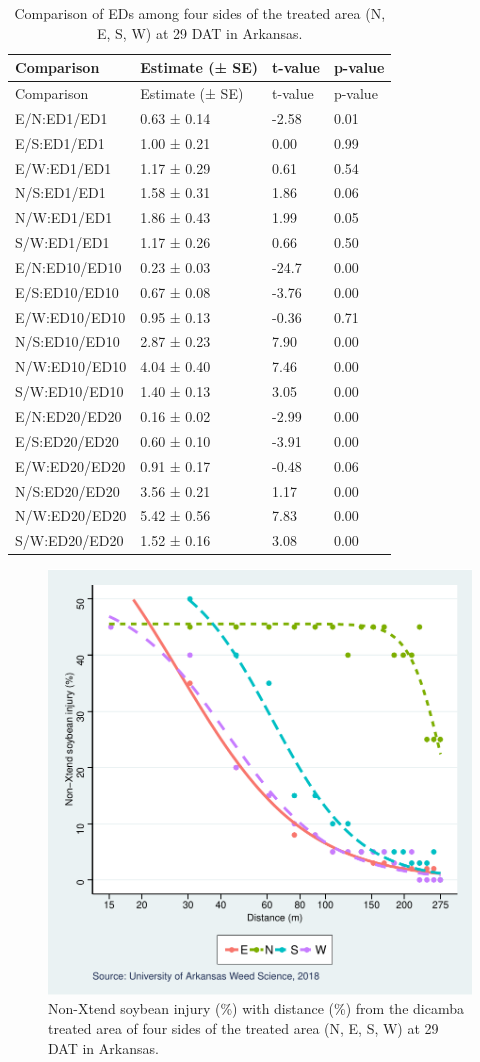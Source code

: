 \documentclass[]{article}
\begin{document}
\begin{longtable}[]{@{}llll@{}}
\caption{Comparison of EDs among four sides of the treated area (N, E,
S, W) at 29 DAT in Arkansas.}\tabularnewline
\toprule
Comparison & Estimate (± SE) & t-value & p-value\tabularnewline
\midrule
\endfirsthead
\toprule
Comparison & Estimate (± SE) & t-value & p-value\tabularnewline
\midrule
\endhead
E/N:ED1/ED1 & 0.63 ± 0.14 & -2.58 & 0.01\tabularnewline
E/S:ED1/ED1 & 1.00 ± 0.21 & 0.00 & 0.99\tabularnewline
E/W:ED1/ED1 & 1.17 ± 0.29 & 0.61 & 0.54\tabularnewline
N/S:ED1/ED1 & 1.58 ± 0.31 & 1.86 & 0.06\tabularnewline
N/W:ED1/ED1 & 1.86 ± 0.43 & 1.99 & 0.05\tabularnewline
S/W:ED1/ED1 & 1.17 ± 0.26 & 0.66 & 0.50\tabularnewline
E/N:ED10/ED10 & 0.23 ± 0.03 & -24.7 & 0.00\tabularnewline
E/S:ED10/ED10 & 0.67 ± 0.08 & -3.76 & 0.00\tabularnewline
E/W:ED10/ED10 & 0.95 ± 0.13 & -0.36 & 0.71\tabularnewline
N/S:ED10/ED10 & 2.87 ± 0.23 & 7.90 & 0.00\tabularnewline
N/W:ED10/ED10 & 4.04 ± 0.40 & 7.46 & 0.00\tabularnewline
S/W:ED10/ED10 & 1.40 ± 0.13 & 3.05 & 0.00\tabularnewline
E/N:ED20/ED20 & 0.16 ± 0.02 & -2.99 & 0.00\tabularnewline
E/S:ED20/ED20 & 0.60 ± 0.10 & -3.91 & 0.00\tabularnewline
E/W:ED20/ED20 & 0.91 ± 0.17 & -0.48 & 0.06\tabularnewline
N/S:ED20/ED20 & 3.56 ± 0.21 & 1.17 & 0.00\tabularnewline
N/W:ED20/ED20 & 5.42 ± 0.56 & 7.83 & 0.00\tabularnewline
S/W:ED20/ED20 & 1.52 ± 0.16 & 3.08 & 0.00\tabularnewline
\bottomrule
\end{longtable}

\begin{figure}
\centering
\includegraphics{Report_Dicamba_study_files/figure-latex/unnamed-chunk-19-1.pdf}
\caption{Non-Xtend soybean injury (\%) with distance (\%) from the
dicamba treated area of four sides of the treated area (N, E, S, W) at
29 DAT in Arkansas.}
\end{figure}
\end{document}
